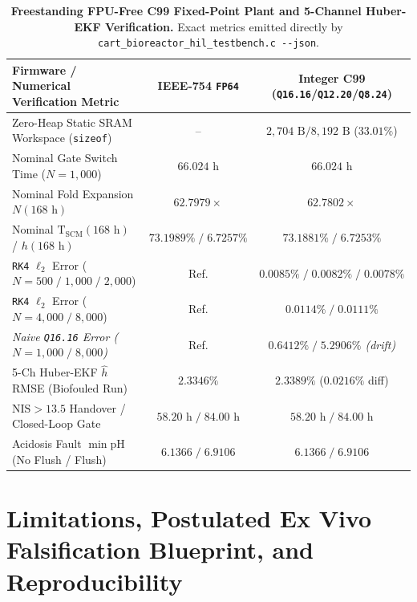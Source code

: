 \documentclass[11pt]{article}
\theoremstyle{plain}
\theoremstyle{remark}
\begin{document}
\begin{table}[t]
\centering
\caption{\textbf{Freestanding FPU-Free C99 Fixed-Point Plant and 5-Channel Huber-EKF Verification.} Exact metrics emitted directly by \texttt{cart\_bioreactor\_hil\_testbench.c -\/-json}.}
\label{tab:hardware}
\small
\begin{tabular}{@{}lcc@{}}
\toprule
\textbf{Firmware / Numerical Verification Metric} & \textbf{IEEE-754 \texttt{FP64}} & \textbf{Integer C99 (\texttt{Q16.16}/\texttt{Q12.20}/\texttt{Q8.24})} \\
\midrule
Zero-Heap Static SRAM Workspace (\texttt{sizeof}) & -- & $2{,}704\text{ B} / 8{,}192\text{ B}$ ($33.01\%$) \\
Nominal Gate Switch Time ($N=1{,}000$) & $66.024\text{ h}$ & $66.024\text{ h}$ \\
Nominal Fold Expansion $N(168\text{ h})$ & $62.7979\times$ & $62.7802\times$ \\
Nominal $\mathrm{T}_{\mathrm{SCM}}(168\text{ h})$ / $h(168\text{ h})$ & $73.1989\%\;/\;6.7257\%$ & $73.1881\%\;/\;6.7253\%$ \\
\texttt{RK4} $\ell_2$ Error ($N = 500\;/\;1{,}000\;/\;2{,}000$) & Ref. & $0.0085\%\;/\;0.0082\%\;/\;0.0078\%$ \\
\texttt{RK4} $\ell_2$ Error ($N = 4{,}000\;/\;8{,}000$) & Ref. & $0.0114\%\;/\;0.0111\%$ \\
\textit{Naive \texttt{Q16.16} Error ($N = 1{,}000\;/\;8{,}000$)} & Ref. & \textit{$0.6412\%\;/\;5.2906\%$ (drift)} \\
5-Ch Huber-EKF $\hat{h}$ RMSE (Biofouled Run) & $2.3346\%$ & $2.3389\%$ ($0.0216\%$ diff) \\
$\mathrm{NIS} > 13.5$ Handover / Closed-Loop Gate & $58.20\text{ h}\;/\;84.00\text{ h}$ & $58.20\text{ h}\;/\;84.00\text{ h}$ \\
Acidosis Fault $\min\mathrm{pH}$ (No Flush / Flush) & $6.1366\;/\;6.9106$ & $6.1366\;/\;6.9106$ \\
\bottomrule
\end{tabular}
\end{table}

\section{Limitations, Postulated Ex Vivo Falsification Blueprint, and Reproducibility}
\label{sec:blueprint}
\end{document}
